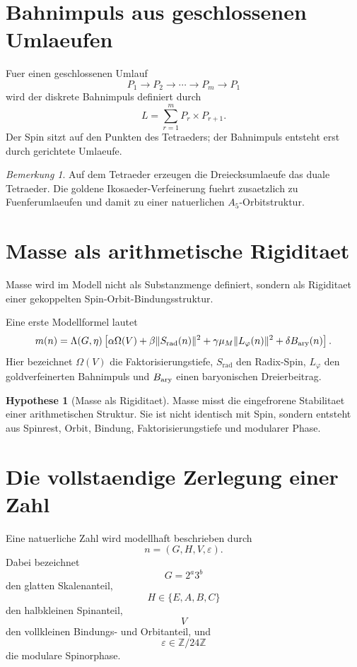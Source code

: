 \documentclass[11pt,a4paper]{article}
\theoremstyle{definition}
\newtheorem{hypothese}[satz]{Hypothese}
\theoremstyle{remark}
\newtheorem{bemerkung}[satz]{Bemerkung}
\DeclareMathOperator{\rad}{rad}
\newcommand{\Z}{\mathbb Z}
\newcommand{\eps}{\varepsilon}
\newcommand{\phig}{\varphi}
\begin{document}
\section{Bahnimpuls aus geschlossenen Umlaeufen}

Fuer einen geschlossenen Umlauf
\[
P_1\to P_2\to\cdots\to P_m\to P_1
\]
wird der diskrete Bahnimpuls definiert durch
\[
L=\sum_{r=1}^{m}P_r\times P_{r+1}.
\]
Der Spin sitzt auf den Punkten des Tetraeders; der Bahnimpuls entsteht erst
durch gerichtete Umlaeufe.

\begin{bemerkung}
Auf dem Tetraeder erzeugen die Dreiecksumlaeufe das duale Tetraeder. Die
goldene Ikosaeder-Verfeinerung fuehrt zusaetzlich zu Fuenferumlaeufen und damit
zu einer natuerlichen \(A_5\)-Orbitstruktur.
\end{bemerkung}

\section{Masse als arithmetische Rigiditaet}

Masse wird im Modell nicht als Substanzmenge definiert, sondern als Rigiditaet
einer gekoppelten Spin-Orbit-Bindungsstruktur.

Eine erste Modellformel lautet
\[
m(n)=\Lambda(G,\eta)\left[\alpha\Omega(V)+\beta\|S_{\rad}(n)\|^2+
\gamma\mu_M\|L_{\phig}(n)\|^2+\delta B_{\rm ary}(n)\right].
\]
Hier bezeichnet \(\Omega(V)\) die Faktorisierungstiefe, \(S_{\rad}\) den
Radix-Spin, \(L_{\phig}\) den goldverfeinerten Bahnimpuls und \(B_{\rm ary}\)
einen baryonischen Dreierbeitrag.

\begin{hypothese}[Masse als Rigiditaet]
Masse misst die eingefrorene Stabilitaet einer arithmetischen Struktur. Sie ist
nicht identisch mit Spin, sondern entsteht aus Spinrest, Orbit, Bindung,
Faktorisierungstiefe und modularer Phase.
\end{hypothese}

\section{Die vollstaendige Zerlegung einer Zahl}

Eine natuerliche Zahl wird modellhaft beschrieben durch
\[
n=(G,H,V,\eps).
\]
Dabei bezeichnet
\[
G=2^a3^b
\]
den glatten Skalenanteil,
\[
H\in\{E,A,B,C\}
\]
den halbkleinen Spinanteil,
\[
V
\]
den vollkleinen Bindungs- und Orbitanteil, und
\[
\eps\in\Z/24\Z
\]
die modulare Spinorphase.
\end{document}

